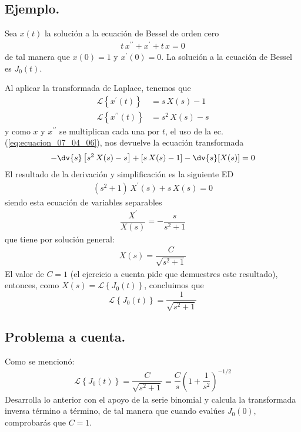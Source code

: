 \subsection*{Ejemplo.}
Sea $x(t)$ la solución a la ecuación de Bessel de orden cero
\begin{align*}
t \, x^{\prime \prime} + x^{\prime} + t \, x = 0
\end{align*}
de tal manera que $x(0) = 1$ y $x^{\prime}(0) = 0$. La solución a la ecuación de Bessel es $J_{0}(t)$.
\par
Al aplicar la transformada de Laplace, tenemos que
\begin{align*}
\mathscr{L} \left\{ x^{\prime} (t) \right\} &= s \, X(s) - 1 \\
\mathscr{L} \left\{ x^{\prime \prime} (t) \right\} &= s^{2} \, X(s) - s
\end{align*}
y como $x$ y $x^{\prime \prime}$ se multiplican cada una por $t$, el uso de la ec. (\ref{eq:ecuacion_07_04_06}), nos devuelve la ecuación transformada
\begin{align*}
- \dv{s} \left[ s^{2} \, X(s) - s \right] + \left[s \, X(s) - 1 \right] - \dv{s} [X(s)] = 0
\end{align*}
El resultado de la derivación y simplificación es la siguiente ED
\begin{align*}
(s^{2} + 1) \, X^{\prime} (s) + s \, X(s) = 0
\end{align*}
siendo esta ecuación de variables separables
\begin{align*}
\dfrac{X^{\prime}}{X(s)} = - \dfrac{s}{s^{2} + 1}
\end{align*}
que tiene por solución general:
\begin{align*}
X(s) = \dfrac{C}{\sqrt{s^{2}+ 1}}
\end{align*}
El valor de $C = 1$ (el ejercicio a cuenta pide que demuestres este resultado), entonces, como $X(s) = \mathscr{L} \left\{ J_{0}(t) \right\}$, concluimos que
\begin{equation}
\mathscr{L} \left\{ J_{0}(t) \right\} = \dfrac{1}{\sqrt{s^{2}+ 1}}
\label{ec:ecuacion_07_04_10}
\end{equation}
\subsection*{Problema a cuenta.}
Como se mencionó:
\begin{align*}
\mathscr{L} \left\{ J_{0}(t) \right\} = \dfrac{C}{\sqrt{s^{2}+ 1}} =  \dfrac{C}{s} \left( 1 + \dfrac{1}{s^{2}} \right)^{-1/2}
\end{align*}
Desarrolla lo anterior con el apoyo de la serie binomial y calcula la transformada inversa término a término, de tal manera que cuando evalúes $J_{0}(0)$, comprobarás que $C = 1$.
